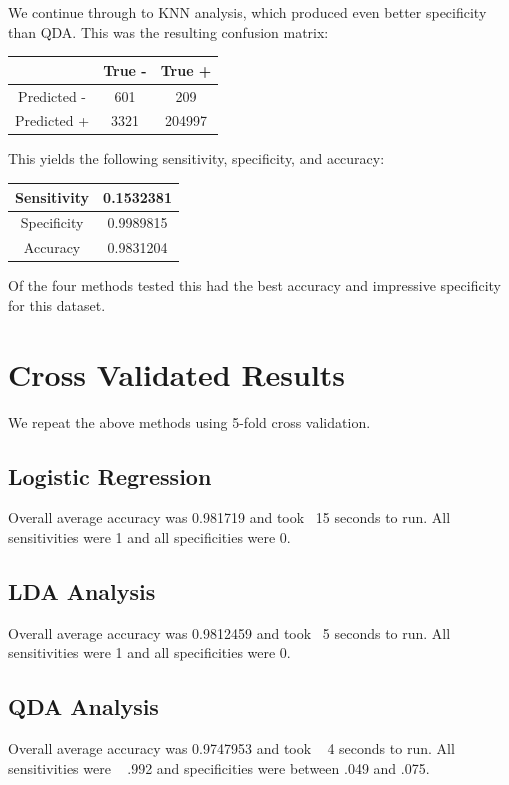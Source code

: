 \documentclass[10pt,twocolumn,letterpaper]{article}
\begin{document}
We continue through to KNN analysis, which produced even better specificity than QDA. This was the resulting confusion matrix:

\begin{center}
	\begin{tabular}{ |c|c|c| } 
		\hline
		& True - & True +\\ 
		\hline
		Predicted - & 601 & 209 \\ 
		\hline
		Predicted + & 3321 & 204997\\
		\hline
	\end{tabular}
\end{center}
This yields the following sensitivity, specificity, and accuracy:
\begin{center}
	\begin{tabular}{ |c|c| } 
		\hline
		Sensitivity & 0.1532381 \\ 
		\hline
		Specificity & 0.9989815 \\
		\hline
		Accuracy & 0.9831204 \\ 
		\hline
	\end{tabular}
\end{center}

Of the four methods tested this had the best accuracy and impressive specificity for this dataset. 


\section{Cross Validated Results}

We repeat the above methods using 5-fold cross validation.

\subsection{Logistic Regression}
Overall average accuracy was 0.981719 and took ~15 seconds to run. All sensitivities were 1 and all specificities were 0.

\subsection{LDA Analysis}
Overall average accuracy was 0.9812459  and took ~5 seconds to run. All sensitivities were 1 and all specificities were 0.

\subsection{QDA Analysis}
Overall average accuracy was 0.9747953 and took ~ 4 seconds to run. All sensitivities were ~ .992 and specificities were between .049 and .075.
\end{document}
